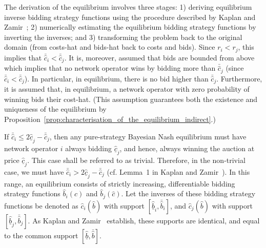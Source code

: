 The derivation of the equilibrium involves three stages: 1) deriving equilibrium inverse bidding strategy functions using the procedure described by Kaplan and Zamir~\cite{KaplanZamir2007}; 2) numerically estimating the equilibrium bidding strategy functions by inverting the inverses; and 3) transforming the problem back to the original domain (from costs-hat and bids-hat back to costs and bids). Since $r_i < r_j$, this implies that $\bar{\hat{c}}_i < \bar{\hat{c}}_j$. It is, moreover, assumed that bids are bounded from above which implies that no network operator wins by bidding more than $\bar{\hat{c}}_j$ (since $\bar{\hat{c}}_i < \bar{\hat{c}}_j$). In particular, in equilibrium, there is no bid higher than $\bar{\hat{c}}_j$. Furthermore, it is assumed that, in equilibrium, a network operator with zero probability of winning bids their cost-hat. (This assumption guarantees both the existence and uniqueness of the equilibrium by Proposition~\ref{prop:characterisation_of_the_equilibrium_indirect}.)

If $\bar{\hat{c}}_i \le 2\underline{\hat{c}}_j - \bar{\hat{c}}_j$, then any pure-strategy Bayesian Nash equilibrium must have network operator $i$ always bidding $\underline{\hat{c}}_j$, and hence, always winning the auction at price $\underline{\hat{c}}_j$. This case shall be referred to as trivial. Therefore, in the non-trivial case, we must have $\bar{\hat{c}}_i > 2\underline{\hat{c}}_j - \bar{\hat{c}}_j$ (cf. Lemma~1 in Kaplan and Zamir~\cite{KaplanZamir2007}). In this range, an equilibrium consists of strictly increasing, differentiable bidding strategy functions $\hat{b}_i(\hat{c})$ and $\hat{b}_j(\hat{c})$. Let the inverses of these bidding strategy functions be denoted as $\hat{c}_i(\hat{b})$ with support $[\underline{\hat{b}}_i, \bar{\hat{b}}_i]$, and $\hat{c}_j(\hat{b})$ with support $[\underline{\hat{b}}_j, \bar{\hat{b}}_j]$. As Kaplan and Zamir~\cite{KaplanZamir2007} establish, these supports are identical, and equal to the common support $[\underline{\hat{b}}, \bar{\hat{b}}]$.

